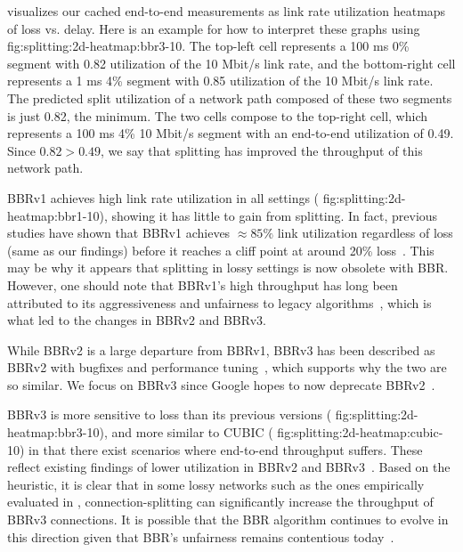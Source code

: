  visualizes our cached end-to-end measurements as link rate
 utilization heatmaps of loss vs. delay.
 Here is an example for how to interpret these graphs using \Cref
 {fig:splitting:2d-heatmap:bbr3-10}. The top-left cell represents a 100 ms 0\% segment
 with 0.82 utilization of the 10 Mbit/s link rate, and the bottom-right cell
 represents a 1 ms 4\% segment with 0.85 utilization of the 10 Mbit/s link
 rate. The predicted split utilization of a network path composed of these two
 segments is just 0.82, the minimum. The two cells compose to the top-right
 cell, which represents a 100 ms 4\% 10 Mbit/s segment with an end-to-end
 utilization of 0.49. Since $0.82>0.49$, we say that splitting has improved the
 throughput of this network path.

BBRv1 achieves high link rate utilization in all settings (\Cref
{fig:splitting:2d-heatmap:bbr1-10}), showing it has little to gain from splitting.
In fact, previous studies have shown that BBRv1 achieves $\approx\!85\%$
link utilization regardless of loss (same as our findings) before it reaches
a cliff point at around 20\% loss~\cite{cao2019use,cardwell2017bbr}.
This may be why it appears that splitting in lossy settings is now obsolete with BBR.
However, one should note that BBRv1's high throughput has long been attributed
to its aggressiveness and unfairness to legacy algorithms~\cite
{ware2019modeling,cao2019use}, which is what led to the changes in BBRv2 and
BBRv3.

While BBRv2 is a large departure from BBRv1, BBRv3 has been described as BBRv2
with bugfixes and performance tuning~\cite{cardwell2024bbrv3-ietf119}, which
supports why the two are so similar. We focus on BBRv3 since Google hopes to
now deprecate BBRv2~\cite{cardwell2024bbrv3-ietf119}.

BBRv3 is more sensitive to loss than its previous versions (\Cref
{fig:splitting:2d-heatmap:bbr3-10}), and more similar to CUBIC (\Cref
{fig:splitting:2d-heatmap:cubic-10}) in that there exist scenarios where end-to-end
throughput suffers.
These reflect existing findings of lower utilization in BBRv2 and BBRv3~\cite
{datta2023replication,song2021understanding,zeynali2024promises}.
Based on the heuristic, it is clear that in some lossy networks
such as the ones empirically evaluated in ,
connection-splitting
can significantly increase the throughput of BBRv3 connections.
It is possible that the BBR algorithm continues to evolve in this direction
given that BBR's unfairness remains contentious today~\cite
{datta2023replication,zeynali2024promises}.

